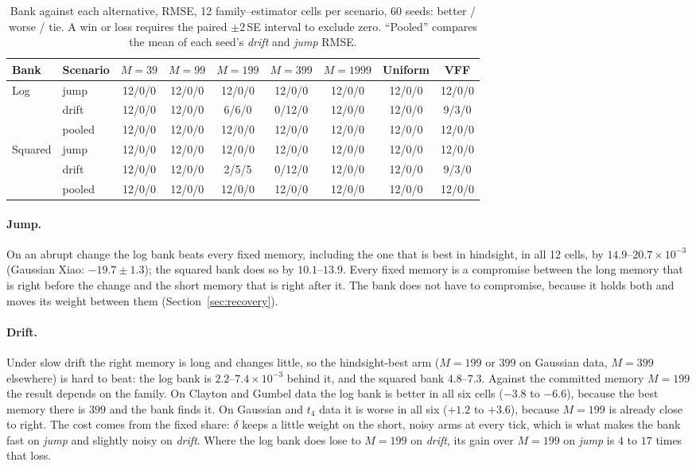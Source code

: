 \begin{table}[ht]
  \centering
  \caption{Bank against each alternative, RMSE, 12 family--estimator cells per scenario, 60 seeds:
    better / worse / tie. A win or loss requires the paired $\pm2$\,SE interval to exclude zero.
    ``Pooled'' compares the mean of each seed's \emph{drift} and \emph{jump} RMSE.}
  \label{tab:bank_counts}
  \small
  \begin{tabular}{llccccccc}
    \toprule
    Bank & Scenario & $M=39$ & $M=99$ & $M=199$ & $M=399$ & $M=1999$ & Uniform & VFF \\
    \midrule
    Log     & jump   & 12/0/0 & 12/0/0 & 12/0/0 & 12/0/0 & 12/0/0 & 12/0/0 & 12/0/0 \\
            & drift  & 12/0/0 & 12/0/0 & 6/6/0  & 0/12/0 & 12/0/0 & 12/0/0 & 9/3/0 \\
            & pooled & 12/0/0 & 12/0/0 & 12/0/0 & 12/0/0 & 12/0/0 & 12/0/0 & 12/0/0 \\
    \addlinespace
    Squared & jump   & 12/0/0 & 12/0/0 & 12/0/0 & 12/0/0 & 12/0/0 & 12/0/0 & 12/0/0 \\
            & drift  & 12/0/0 & 12/0/0 & 2/5/5  & 0/12/0 & 12/0/0 & 12/0/0 & 9/3/0 \\
            & pooled & 12/0/0 & 12/0/0 & 12/0/0 & 12/0/0 & 12/0/0 & 12/0/0 & 12/0/0 \\
    \bottomrule
  \end{tabular}
\end{table}

\paragraph{Jump.} On an abrupt change the log bank beats every fixed memory, including the one
that is best in hindsight, in all 12 cells, by $14.9$--$20.7\times10^{-3}$ (Gaussian Xiao:
$-19.7\pm1.3$); the squared bank does so by $10.1$--$13.9$. Every fixed memory is a compromise
between the long memory that is right before the change and the short memory that is right after
it. The bank does not have to compromise, because it holds both and moves its weight between them
(Section~\ref{sec:recovery}).

\paragraph{Drift.} Under slow drift the right memory is long and changes little, so the
hindsight-best arm ($M=199$ or $399$ on Gaussian data, $M=399$ elsewhere) is hard to beat: the log bank is
$2.2$--$7.4\times10^{-3}$ behind it, and the squared bank $4.8$--$7.3$. Against the committed
memory $M=199$ the result depends on the family. On Clayton and Gumbel data the log bank is better
in all six cells ($-3.8$ to $-6.6$), because the best memory there is $399$ and the bank finds it.
On Gaussian and $t_4$ data it is worse in all six ($+1.2$ to $+3.6$), because $M=199$ is already
close to right. The cost comes from the fixed share: $\delta$ keeps a little weight on the short,
noisy arms at every tick, which is what makes the bank fast on \emph{jump} and slightly noisy on
\emph{drift}. Where the log bank does lose to $M=199$ on \emph{drift}, its gain over $M=199$ on
\emph{jump} is $4$ to $17$ times that loss.


